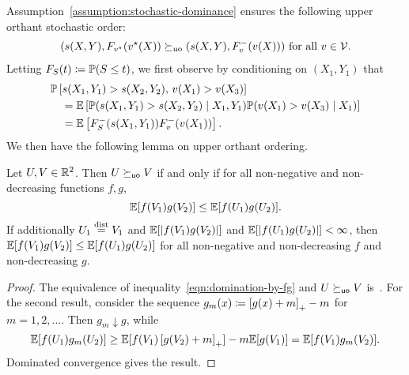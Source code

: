 Assumption~\ref{assumption:stochastic-dominance} ensures the following upper orthant stochastic order:
\begin{align*}
(s(X,Y),  F_{v^\star}(v^\star(X)) \succeq_{\textup{uo}} (s(X,Y),  F_v^-(v(X))) \text{ for all } v \in \mathcal{V}.
\end{align*}
Letting $F_S(t) \coloneqq \mathbb{P}( S \le t)$, we first observe by conditioning on $(X_1, Y_1)$ that
\begin{align*}
&\mathbb{P}\left[ s(X_1,  Y_1) > s(X_2, Y_2), \, v(X_1) > v(X_3) \right] \\
&\quad =
\mathbb{E}\left[ \mathbb{P}(s(X_1,  Y_1) > s(X_2, Y_2) \mid X_1, Y_1) \mathbb{P}(v(X_1) > v(X_3) \mid X_1) \right] \\
&\quad = \mathbb{E}\left[ F_S^-(s(X_1, Y_1)) F_v^-(v(X_1)) \right].
\end{align*}
We then have the following lemma on upper orthant ordering.
\begin{lemma}
  \label{lemma:orders}
  Let $U, V \in \mathbb{R}^2$. Then $U \succeq_{\mathsf{uo}} V$ if and only if for all
  non-negative and non-decreasing functions $f, g$,
  \begin{equation}
    \label{eqn:domination-by-fg}
    \mathbb{E}[f(V_1) g(V_2)]
    \le \mathbb{E}[f(U_1) g(U_2)].
  \end{equation}
  If additionally  $U_1 \stackrel{\textup{dist}}{=} V_1$ and $\mathbb{E}[|f(V_1) g(V_2)|]$
  and $\mathbb{E}[|f(U_1) g(U_2)|] < \infty$,
  then $\mathbb{E}[f(V_1) g(V_2)] \le \mathbb{E}[f(U_1) g(U_2)]$ for all
  non-negative and non-decreasing $f$ and non-decreasing $g$.
\end{lemma}
\begin{proof}
  The equivalence of inequality~\eqref{eqn:domination-by-fg} and
  $U \succeq_{\mathsf{uo}} V$ is~\cite[Eq.~(6.B.4)]{ShakedSh07}.
  For the second result, consider the sequence
  $g_m(x) \coloneqq \left[{g(x) + m}\right]_+ - m$
  for $m = 1, 2, \ldots$. Then $g_m \downarrow g$, while
  \begin{equation*}
    \mathbb{E}[f(U_1) g_m(U_2)]
    \ge \mathbb{E}[f(V_1) \left[{g(V_2) + m}\right]_+] - m \mathbb{E}[g(V_1)]
    = \mathbb{E}[f(V_1) g_m(V_2)].
  \end{equation*}
  Dominated convergence gives the result.
\end{proof}

